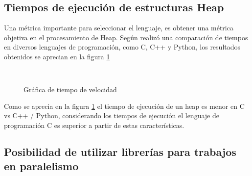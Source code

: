 \subsection*{Tiempos de ejecución de estructuras Heap} 

Una métrica importante para seleccionar el lenguaje, es obtener una métrica objetiva en el procesamiento de Heap. Según \cite{heap} realizó una comparación de tiempos en diversos lenguajes de programación, como C, C++ y Python, los resultados obtenidos se aprecian en la figura \ref{speedheap}

\begin{figure}
\begin{center}
~~~~~~~~~~~~
\caption{\label{speedheap} Gráfica de tiempo de velocidad}
\end{center}
\end{figure}

Como se aprecia en la figura \ref{speedheap} el tiempo de ejecución de un heap es menor en C vs C++ / Python, considerando los tiempos de ejecución el lenguaje de programación C es superior a partir de estas características. 

\subsection*{Posibilidad de utilizar librerías para trabajos en paralelismo}

